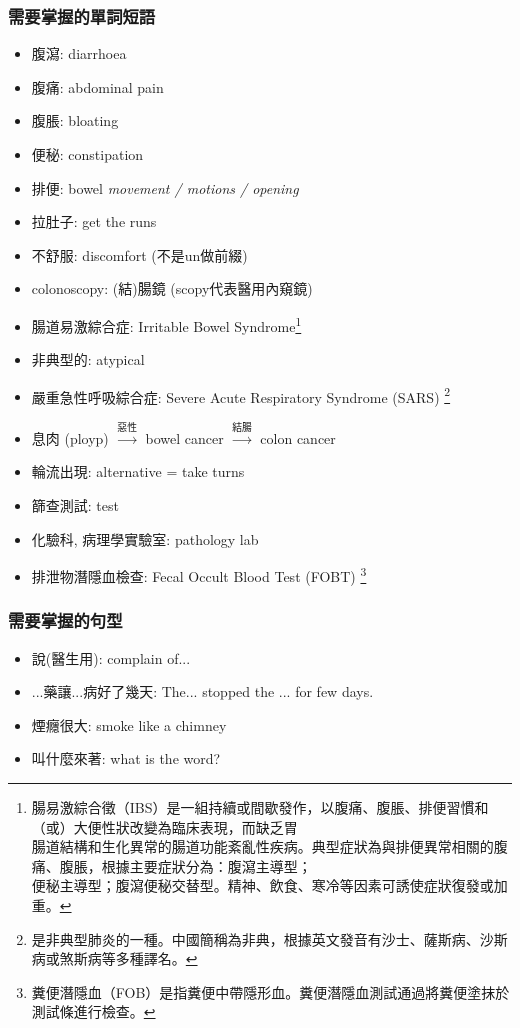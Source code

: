 \subsubsection*{需要掌握的單詞短語}
\begin{multicols}{2}
\begin{itemize}
  \itemsep0em
  \item 腹瀉: diarrhoea
  \item 腹痛: abdominal pain
  \item 腹脹: bloating
  \item 便秘: constipation
  \item 排便: bowel \textit{movement / motions / opening}
  \item 拉肚子: get the runs
  \item 不舒服: discomfort (不是un做前綴)
  \item colonoscopy: (結)腸鏡 (scopy代表醫用內窺鏡)
  \item 腸道易激綜合症: Irritable Bowel Syndrome\footnote{腸易激綜合徵（IBS）是一組持續或間歇發作，以腹痛、腹脹、排便習慣和（或）大便性狀改變為臨床表現，而缺乏胃\\腸道結構和生化異常的腸道功能紊亂性疾病。典型症狀為與排便異常相關的腹痛、腹脹，根據主要症狀分為：腹瀉主導型；\\便秘主導型；腹瀉便秘交替型。精神、飲食、寒冷等因素可誘使症狀復發或加重。}
  \item 非典型的: atypical
  \item 嚴重急性呼吸綜合症: Severe Acute Respiratory Syndrome (SARS) \footnote{是非典型肺炎的一種。中國簡稱為非典，根據英文發音有沙士、薩斯病、沙斯病或煞斯病等多種譯名。}
  \item 息肉 (ployp) $\xrightarrow{\text{惡性}}$ bowel cancer $\xrightarrow{\text{結腸}}$ colon cancer
  \item 輪流出現: alternative = take turns
  \item 篩查測試:  test
  \item 化驗科, 病理學實驗室: pathology lab
  \item 排泄物潛隱血檢查: Fecal Occult Blood Test (FOBT) \footnote{糞便潛隱血（FOB）是指糞便中帶隱形血。糞便潛隱血測試通過將糞便塗抹於測試條進行檢查。}
\end{itemize}
\end{multicols}

\subsubsection*{需要掌握的句型}
\begin{itemize}
  \item 說(醫生用): complain of...
  \item ...藥讓...病好了幾天: The... stopped the ... for few days.
  \item 煙癮很大: smoke like a chimney
  \item 叫什麼來著: what is the word?
\end{itemize}

